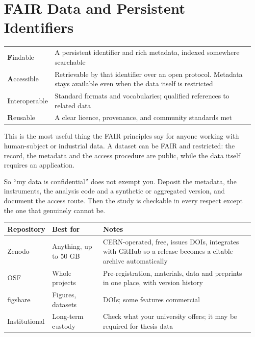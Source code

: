 \section{FAIR Data and Persistent Identifiers}

\begin{center}
\small
\begin{tabular}{@{}L{2.6cm}L{11.7cm}@{}}
\toprule
\textbf{F}indable    & A persistent identifier and rich metadata, indexed
                       somewhere searchable \\
\textbf{A}ccessible  & Retrievable by that identifier over an open protocol.
                       Metadata stays available even when the data itself is
                       restricted \\
\textbf{I}nteroperable & Standard formats and vocabularies; qualified
                       references to related data \\
\textbf{R}eusable    & A clear licence, provenance, and community standards
                       met~\cite{wilkinson2016fair} \\
\bottomrule
\end{tabular}
\end{center}

\begin{conceptbox}
This is the most useful thing the FAIR principles say for anyone working with
human-subject or industrial data. A dataset can be FAIR and restricted: the
record, the metadata and the access procedure are public, while the data itself
requires an application.

\medskip
So ``my data is confidential'' does not exempt you. Deposit the metadata, the
instruments, the analysis code and a synthetic or aggregated version, and
document the access route. Then the study is checkable in every respect except
the one that genuinely cannot be.
\end{conceptbox}

\begin{center}
\small
\begin{tabular}{@{}L{2.4cm}L{4.2cm}L{7.5cm}@{}}
\toprule
\textbf{Repository} & \textbf{Best for} & \textbf{Notes} \\
\midrule
Zenodo   & Anything, up to 50 GB
         & CERN-operated, free, issues DOIs, integrates with GitHub so a
           release becomes a citable archive automatically \\
OSF      & Whole projects
         & Pre-registration, materials, data and preprints in one place, with
           version history \\
figshare & Figures, datasets & DOIs; some features commercial \\
Institutional & Long-term custody & Check what your university offers;
           it may be required for thesis data \\
\bottomrule
\end{tabular}
\end{center}

